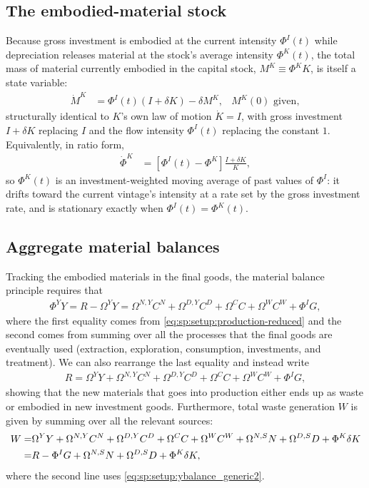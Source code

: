 \subsection{The embodied-material stock}
\label{sec:sp:setup:embodied-stock}
Because gross investment is embodied at the current intensity $\Phi^I(t)$ while depreciation releases material at the stock's average intensity $\Phi^K(t)$, the total mass of material currently embodied in the capital stock, $M^K\equiv\Phi^KK$, is itself a state variable:
\begin{align}
\dot M^K &= \Phi^I(t)\left(I+\delta K\right)-\delta M^K,
&
M^K(0) \text{ given},
\label{eq:sp:setup:Phi-motion}
\end{align}
structurally identical to $K$'s own law of motion $\dot K=I$, with gross investment $I+\delta K$ replacing $I$ and the flow intensity $\Phi^I(t)$ replacing the constant $1$. Equivalently, in ratio form,
\begin{align}
\dot\Phi^K &= \left[\Phi^I(t)-\Phi^K\right]\frac{I+\delta K}{K},
\label{eq:sp:setup:phiK-motion}
\end{align}
so $\Phi^K(t)$ is an investment-weighted moving average of past values of $\Phi^I$: it drifts toward the current vintage's intensity at a rate set by the gross investment rate, and is stationary exactly when $\Phi^I(t)=\Phi^K(t)$.


\subsection{Aggregate material balances}
\label{sec:sp:setup:aggregatematerial}
Tracking the embodied materials in the final goods, the material balance principle requires that
\begin{align}
    \Phi^Y Y = R - \Omega^Y Y = \Omega^{N,Y}C^N + \Omega^{D,Y}C^D + \Omega^C C + \Omega^W C^W +\Phi^I G, \label{eq:sp:setup:ybalance_generic}
\end{align}
where the first equality comes from \eqref{eq:sp:setup:production-reduced} and the second comes from summing over all the processes that the final goods are eventually used (extraction, exploration, consumption, investments, and treatment). We can also rearrange the last equality and instead write
\begin{align}
    R =  \Omega^Y Y + \Omega^{N,Y}C^N + \Omega^{D,Y}C^D + \Omega^C C + \Omega^W C^W + \Phi^I G \label{eq:sp:setup:ybalance_generic2},
\end{align}
showing that the new materials that goes into production either ends up as waste or embodied in new investment goods. Furthermore, total waste generation $W$ is given by summing over all the relevant sources:
\begin{align}
    W =& \Omega^Y Y + \Omega^{N,Y}C^N + \Omega^{D,Y}C^D + \Omega^C C + \Omega^W C^W + \Omega^{N,S}N + \Omega^{D,S}D + \Phi^K \delta K \notag \\
    =& R - \Phi^I G + \Omega^{N,S}N + \Omega^{D,S}D + \Phi^K\delta K,
    \label{eq:sp:setup:totalwaste_generic}
\end{align}
where the second line uses \eqref{eq:sp:setup:ybalance_generic2}. 



